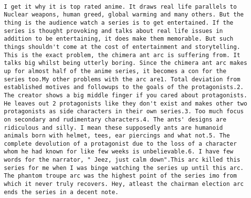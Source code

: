 \documentclass[
]{article}
\begin{document}
\begin{verbatim}
                                                                                    I get it why it is top rated anime. It draws real life parallels to Nuclear weapons, human greed, global warming and many others. But the thing is the audience watch a series is to get entertained. If the series is thought provoking and talks about real life issues in addition to be entertaining, it does make them memorable. But such things shouldn't come at the cost of entertainment and storytelling. This is the exact problem, the chimera ant arc is suffering from. It talks big whilst being utterly boring. Since the chimera ant arc makes up for almost half of the anime series, it becomes a con for the series too.My other problems with the arc are1. Total deviation from established motives and followups to the goals of the protagonists.2. The creator shows a big middle finger if you cared about protagonists. He leaves out 2 protagonists like they don't exist and makes other two protagonists as side characters in their own series.3. Too much focus on secondary and rudimentary characters.4. The ants' designs are ridiculous and silly. I mean these supposedly ants are humanoid animals born with helmet, tees, ear piercings and what not.5. The complete devolution of a protagonist due to the loss of a character whom he had known for like few weeks is unbelievable.6. I have few words for the narrator, " Jeez, just calm down".This arc killed this series for me when I was binge watching the series up until this arc. The phantom troupe arc was the highest point of the series imo from which it never truly recovers. Hey, atleast the chairman election arc ends the series in a decent note.

\end{verbatim}
\end{document}
